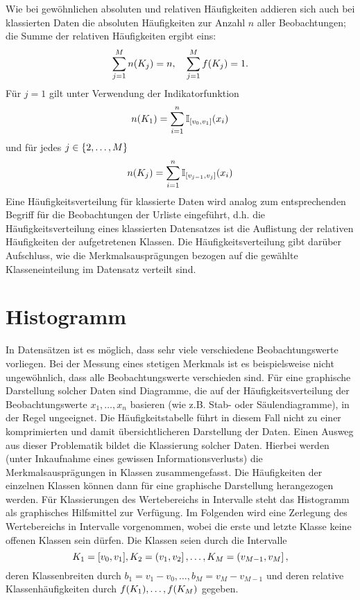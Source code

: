 \documentclass{lecture}
\begin{document}
    Wie bei gewöhnlichen absoluten und relativen Häufigkeiten addieren sich auch bei klassierten Daten die absoluten Häufigkeiten zur Anzahl \(n\) aller Beobachtungen; die Summe der relativen Häufigkeiten ergibt eins:
    \[
        \sum_{j = 1}^M n\parentheses*{K_j} = n, \quad \sum_{j = 1}^M f\parentheses*{K_j} = 1.
    \]
    Für \(j = 1\) gilt unter Verwendung der Indikatorfunktion
    \[
        n\parentheses*{K_1} = \sum_{i = 1}^n \mathbb{I}_{\brackets*{v_0, v_1}}\parentheses*{x_i}
    \]
    und für jedes \(j \in \braces*{2, \ldots, M}\)
    \[
        n\parentheses*{K_j} = \sum_{i = 1}^n \mathbb{I}_{\brackets*{v_{j - 1}, v_j}}\parentheses*{x_i}
    \]
    Eine Häufigkeitsverteilung für klassierte Daten wird analog zum entsprechenden Begriff für die Beobachtungen der Urliste eingeführt, d.h. die Häufigkeitsverteilung eines klassierten Datensatzes ist die Auflistung der relativen Häufigkeiten der aufgetretenen Klassen.
    Die Häufigkeitsverteilung gibt darüber Aufschluss, wie die Merkmalsausprägungen bezogen auf die gewählte Klasseneinteilung im Datensatz verteilt sind.


    \section*{Histogramm}

    In Datensätzen ist es möglich, dass sehr viele verschiedene Beobachtungswerte vorliegen.
    Bei der Messung eines stetigen Merkmals ist es beispielsweise nicht ungewöhnlich, dass alle Beobachtungswerte verschieden sind.
    Für eine graphische Darstellung solcher Daten sind Diagramme, die auf der Häufigkeitsverteilung der Beobachtungswerte \(x_1, \ldots, x_n\) basieren (wie z.B. Stab- oder Säulendiagramme), in der Regel ungeeignet.
    Die Häufigkeitstabelle führt in diesem Fall nicht zu einer komprimierten und damit übersichtlicheren Darstellung der Daten.
    Einen Ausweg aus dieser Problematik bildet die Klassierung solcher Daten.
    Hierbei werden (unter Inkaufnahme eines gewissen Informationsverlusts) die Merkmalsausprägungen in Klassen zusammengefasst. Die Häufigkeiten der einzelnen Klassen können dann für eine graphische Darstellung herangezogen werden.
    Für Klassierungen des Wertebereichs in Intervalle steht das Histogramm als graphisches Hilfsmittel zur Verfügung.
    Im Folgenden wird eine Zerlegung des Wertebereichs in Intervalle vorgenommen, wobei die erste und letzte Klasse keine offenen Klassen sein dürfen.
    Die Klassen seien durch die Intervalle
    \[
        K_1 = \brackets*{v_0, v_1}, K_2 = \left(v_1, v_2\right], \ldots, K_M = \left(v_{M - 1}, v_M\right],
    \]
    deren Klassenbreiten durch \(b_1 = v_1 - v_0, \ldots, b_M = v_M - v_{M - 1}\) und deren relative Klassenhäufigkeiten durch \(f\parentheses*{K_1}, \ldots, f\parentheses*{K_M}\) gegeben.
\end{document}
